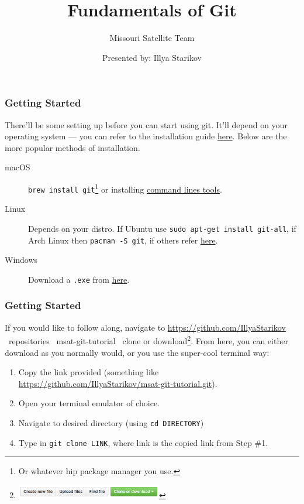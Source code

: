 \documentclass{beamer}
\title{Fundamentals of Git}
\subtitle{Missouri Satellite Team}
\author{Presented by: Illya Starikov}
\date{ }
\newcommand{\shellcmd}[1]{\texttt{\colorbox{gray!30}{#1}}}
\begin{document}
\begin{frame}
    \maketitle
\end{frame}

\begin{frame}
    \frametitle{Getting Started}

    There'll be some setting up before you can start using git. It'll depend on your operating system --- you can refer to the installation guide
    \href{https://git-scm.com/book/en/v2/Getting-Started-Installing-Git}{here}.
    Below are the more popular methods of installation.

    \begin{description}
        \item[macOS] \shellcmd{brew install git}\footnote{Or whatever hip package manager you use.} or installing \href{http://osxdaily.com/2014/02/12/install-command-line-tools-mac-os-x/}{command lines tools}.
        \item[Linux] Depends on your distro. If Ubuntu use \shellcmd{sudo apt-get install git-all}, if Arch Linux then \shellcmd{pacman -S git}, if others refer \href{https://git-scm.com/download/linux}{here}.
        \item[Windows] Download a \texttt{.exe} from \href{https://git-scm.com/download/win}{here}.
    \end{description}

\end{frame}

\begin{frame}
    \frametitle{Getting Started}
    If you would like to follow along, navigate to \url{https://github.com/IllyaStarikov} \textrightarrow \ repositories \textrightarrow \ msat-git-tutorial \textrightarrow \ clone or download\footnote{\includegraphics[width=0.5\textwidth]{github-clone}}. From here, you can either download as you normally would, or you use the super-cool terminal way:

    \begin{enumerate}
        \item Copy the link provided (something like \url{https://github.com/IllyaStarikov/msat-git-tutorial.git}).
        \item Open your terminal emulator of choice.
        \item Navigate to desired directory (using \shellcmd{cd DIRECTORY})
        \item Type in \shellcmd{git clone LINK}, where link is the copied link from Step \#1.
    \end{enumerate}


\end{frame}
\end{document}
